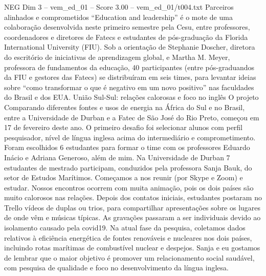 \begin{textsample}{NEG Dim 3 – vem\_ed\_01 – Score 3.00 – vem\_ed\_01/t004.txt}  \label{ex:f3_neg_095}
Parceiros alinhados e comprometidos “Education and leadership” é o mote de uma colaboração desenvolvida neste primeiro semestre pela Cesu, entre professores, coordenadores e diretores de Fatecs e estudantes de pós-graduação da Florida International University (FIU).
Sob a orientação de Stephanie Doscher, diretora do escritório de iniciativas de aprendizagem global, e Martha M.
Meyer, professora de fundamentos da educação, 40 participantes (entre pós-graduandos da FIU e gestores das Fatecs) se distribuíram em seis times, para levantar ideias sobre “como transformar o que é negativo em um novo positivo” nas faculdades do Brasil e dos EUA.
União Sul-Sul: relações calorosas e foco no inglês O projeto Comparando diferentes fontes e usos de energia na África do Sul e no Brasil, entre a Universidade de Durban e a Fatec de São José do Rio Preto, começou em 17 de fevereiro deste ano.
O primeiro desafio foi selecionar alunos com perfil pesquisador, nível de língua inglesa acima do intermediário e comprometimento.
Foram escolhidos 6 estudantes para formar o time com os professores Eduardo Inácio e Adriana Generoso, além de mim.
Na Universidade de Durban 7 estudantes de mestrado participam, conduzidos pela professora Sanja Bauk, do setor de Estudos Marítimos.
Começamos a nos reunir (por Skype e Zoom) e estudar.
Nossos encontros ocorrem com muita animação, pois os dois países são muito calorosos nas relações.
Depois dos contatos iniciais, estudantes postaram no Trello vídeos de duplas ou trios, para compartilhar apresentações sobre os lugares de onde vêm e músicas típicas.
As gravações passaram a ser individuais devido ao isolamento causado pela covid19.
Na atual fase da pesquisa, coletamos dados relativos à eficiência energética de fontes renováveis e nucleares nos dois países, incluindo rotas marítimas de combustível nuclear e despejos.
Sanja e eu gostamos de lembrar que o maior objetivo é promover um relacionamento social saudável, com pesquisa de qualidade e foco no desenvolvimento da língua inglesa.

\end{textsample}
